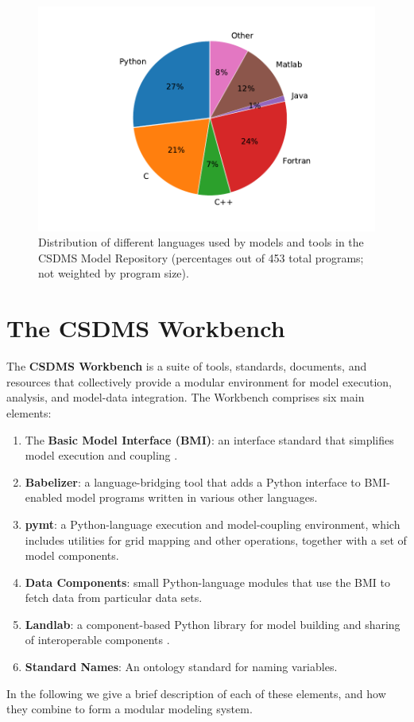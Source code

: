 \documentclass[journal abbreviation, manuscript]{copernicus}
\begin{document}
\begin{figure}[h!]
\centering
\includegraphics[scale=0.8]{Figures/fig04.pdf}
\caption{Distribution of different languages used by models and tools in the CSDMS Model Repository (percentages out of 453 total programs; not weighted by program size).}
\label{fig:languages}
\end{figure}


\section{The CSDMS Workbench}
\label{sec:workbench}

The \textbf{CSDMS Workbench} is a suite of tools, standards, documents, and resources that collectively provide a modular environment for model execution, analysis, and model-data integration. The Workbench comprises six main elements: 
\begin{enumerate}
    \item The \textbf{Basic Model Interface (BMI)}: an interface standard that simplifies model execution and coupling \citep{hutton2020basic,peckham2013component}.
    \item \textbf{Babelizer}: a language-bridging tool that adds a Python interface to BMI-enabled model programs written in various other languages.
    \item \textbf{pymt}: a Python-language execution and model-coupling environment, which includes utilities for grid mapping and other operations, together with a set of model components.
    \item \textbf{Data Components}: small Python-language modules that use the BMI to fetch data from particular data sets.
    \item \textbf{Landlab}: a component-based Python library for model building and sharing of interoperable components \citep{hobley2017creative,barnhart2020short}.
    \item \textbf{Standard Names}: An ontology standard for naming variables.
\end{enumerate}
In the following we give a brief description of each of these elements, and how they combine to form a modular modeling system.
\end{document}
